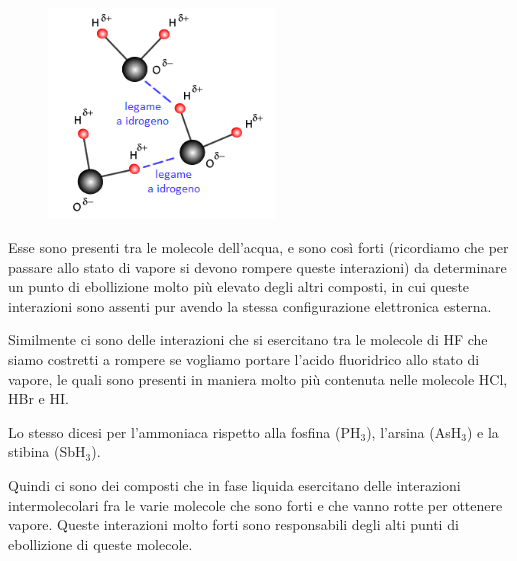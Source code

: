 \begin{minipage}{0.39 \textwidth}
    \begin{figure}[H]
        \includegraphics[width=6cm]{immagini/legame_a_idrogeno.png}
    \end{figure}
\end{minipage}
\begin{minipage}{0.6 \textwidth}
Esse sono presenti tra le molecole dell'acqua, e sono così forti (ricordiamo che per passare allo stato di vapore si devono rompere queste interazioni) da determinare un punto di ebollizione molto più elevato degli altri composti, in cui queste interazioni sono assenti pur avendo la stessa configurazione elettronica esterna.

Similmente ci sono delle interazioni che si esercitano tra le molecole di HF che siamo costretti a rompere se vogliamo portare l'acido fluoridrico allo stato di vapore, le quali sono presenti in maniera molto più contenuta nelle molecole HCl, HBr e HI.

Lo stesso dicesi per l'ammoniaca rispetto alla fosfina (PH$_3$), l'arsina (AsH$_3$) e la stibina (SbH$_3$).
\end{minipage}

\vspace{0.2cm}Quindi ci sono dei composti che in fase liquida esercitano delle interazioni intermolecolari fra le varie molecole che sono forti e che vanno rotte per ottenere vapore. Queste interazioni molto forti sono responsabili degli alti punti di ebollizione di queste molecole.